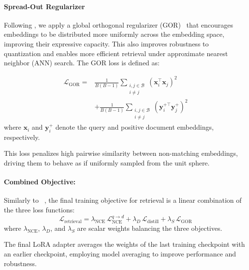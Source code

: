 \documentclass[11pt]{article}
\begin{document}
\paragraph{Spread-Out Regularizer}
Following \citet{vera2025embeddinggemma}, we apply a global orthogonal regularizer (GOR)~\citep{zhang2017learning} that encourages embeddings to be distributed more uniformly across the embedding space, improving their expressive capacity. This also improves robustness to quantization and enables more efficient retrieval under approximate nearest neighbor (ANN) search. The GOR loss is defined as:

\begin{equation}
\label{eq:spread_out_loss}
\begin{aligned}
\mathcal{L}_\text{GOR} = {} &
\frac{1}{B(B-1)} 
\sum_{\substack{i,j \in \mathcal{B} \\ i \neq j}}
(\mathbf{x}_i^\top \mathbf{x}_j)^2 \\
&+
\frac{1}{B(B-1)} 
\sum_{\substack{i,j \in \mathcal{B} \\ i \neq j}}
(\mathbf{y}_i^{+\top} \mathbf{y}_j^{+})^2
\end{aligned}
\end{equation}
%
where $\mathbf{x}_i$ and $\mathbf{y}_i^{+}$ denote the query and positive document embeddings, respectively. 

This loss penalizes high pairwise similarity between non-matching embeddings, driving them to behave as if uniformly sampled from the unit sphere.

\paragraph{Combined Objective:}
Similarly to ~\citet{vera2025embeddinggemma}, the final training objective for retrieval is a linear combination of the three loss functions:
\begin{equation}
    \label{eq:retrieval_total_loss}
    \mathcal{L}_{\text{retrieval}} = \lambda_{\text{NCE}} \, \mathcal{L}_{\text{NCE}}^{q \rightarrow d} + \lambda_D \, \mathcal{L}_{\text{distill}} + \lambda_S \, \mathcal{L}_\text{GOR}
\end{equation}
where $\lambda_{\text{NCE}}$, $\lambda_D$, and $\lambda_S$ are scalar weights balancing the three objectives.

The final LoRA adapter averages the weights of the last training checkpoint with an earlier checkpoint, employing model averaging to improve performance and robustness.
\end{document}
